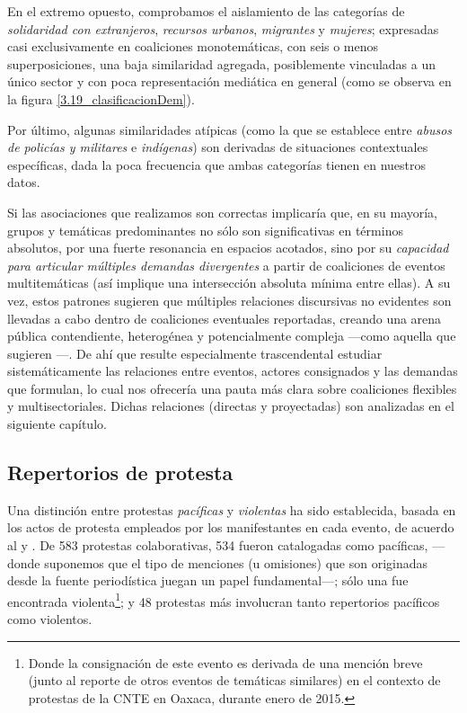 \documentclass[letterpaper, 11pt]{book}
\theoremstyle{definition}
\theoremstyle{remark}
\begin{document}
En el extremo opuesto, comprobamos el aislamiento de las categorías de \emph{solidaridad con extranjeros},  \emph{recursos urbanos},  \emph{migrantes} y \emph{mujeres}; expresadas casi exclusivamente en coaliciones monotemáticas, con seis o menos superposiciones, una baja similaridad agregada, posiblemente vinculadas a un único sector y con poca representación mediática en general (como se observa en la figura \ref{3.19_clasificacionDem}). 


Por último, algunas similaridades atípicas (como la que se establece entre \emph{abusos de policías y militares} e \emph{indígenas}) son derivadas de situaciones contextuales específicas, dada la poca frecuencia que ambas categorías tienen en nuestros datos. 

Si las asociaciones que realizamos son correctas implicaría que, en su mayoría, grupos y temáticas predominantes no sólo son significativas en términos absolutos, por una fuerte resonancia en espacios acotados, sino por su \emph{capacidad para articular múltiples demandas divergentes} a partir de coaliciones de eventos multitemáticas (así implique una intersección absoluta mínima entre ellas). 
A su vez, estos patrones sugieren que múltiples relaciones discursivas no evidentes son llevadas a cabo dentro de coaliciones eventuales reportadas, creando una arena pública contendiente, heterogénea y potencialmente compleja ---como aquella que sugieren \citet{2000_MischePattison_civicArena}---. 
De ahí que resulte especialmente trascendental estudiar sistemáticamente las relaciones entre eventos, actores consignados y las demandas que formulan, lo cual nos ofrecería una pauta más clara sobre coaliciones flexibles y multisectoriales. 
Dichas relaciones (directas y proyectadas) son analizadas en el siguiente capítulo.  






\vspace{-1em}
\subsection{Repertorios de protesta}
\label{sec:repertorios}

Una distinción entre protestas \emph{pacíficas} y \emph{violentas} ha sido establecida, basada en los actos de protesta empleados por los manifestantes en cada evento, de acuerdo al  y . 
De 583 protestas colaborativas, 534 fueron catalogadas como pacíficas, ---donde suponemos que el tipo de menciones (u omisiones) que son originadas desde la fuente periodística juegan un papel fundamental---; sólo una fue encontrada violenta\footnote{
    Donde la consignación de este evento es derivada de una mención breve (junto al reporte de otros eventos de temáticas similares) en el contexto de protestas de la CNTE en Oaxaca, durante enero de 2015. 
}; 
y 48 protestas más involucran tanto repertorios pacíficos como violentos. 
\end{document}
